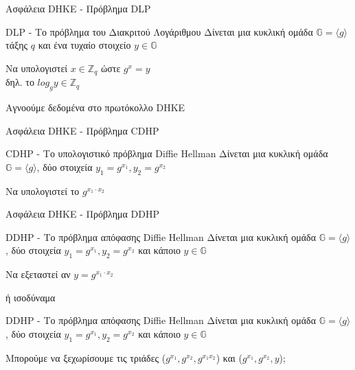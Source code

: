 \documentclass[handout]{beamer}
\begin{document}
\begin{frame}{Ασφάλεια DHKE - Πρόβλημα DLP}

\begin{block}{DLP - Το πρόβλημα του Διακριτού Λογάριθμου}
Δίνεται μια κυκλική ομάδα $\mathbb{G}=\langle g \rangle$ τάξης $q$ και ένα τυχαίο στοιχείο $y \in \mathbb{G}$

Να υπολογιστεί $x \in \mathbb{Z}_q$ ώστε $g^x = y$ \\
δηλ. το $log_g y \in \mathbb{Z}_q$
\end{block}
\pause
\alert{Αγνοούμε δεδομένα στο πρωτόκολλο DHKE}
\end{frame}

\begin{frame}{Ασφάλεια DHKE - Πρόβλημα CDHP}
\begin{block}{CDHP - Το υπολογιστικό πρόβλημα Diffie Hellman}
Δίνεται μια κυκλική ομάδα $\mathbb{G}=\langle g \rangle$, δύο στοιχεία $y_1=g^{x_1}, y_2 = g^{x_2}$

Να υπολογιστεί το $g^{x_1 \cdot x_2}$ 
\end{block}
\end{frame}

\begin{frame}{Ασφάλεια DHKE - Πρόβλημα DDHP}

\begin{block}{DDHP - Το πρόβλημα απόφασης Diffie Hellman}
Δίνεται μια κυκλική  ομάδα $\mathbb{G}=\langle g \rangle$, δύο στοιχεία $y_1=g^{x_1}, y_2 = g^{x_2}$ και κάποιο  $y \in \mathbb{G}$ 

Να εξεταστεί αν  $y = g^{x_1 \cdot x_2}$ 
\end{block}
\pause
ή ισοδύναμα
\begin{block}{DDHP - Το πρόβλημα απόφασης Diffie Hellman}
Δίνεται μια κυκλική  ομάδα $\mathbb{G}=\langle g \rangle$, δύο στοιχεία $y_1=g^{x_1}, y_2 = g^{x_2}$ και κάποιο  $y \in \mathbb{G}$ 

Μπορούμε να ξεχωρίσουμε τις τριάδες ($g^{x_1}, g^{x_2}, g^{x_1 x_2}$) και  ($g^{x_1}, g^{x_2}, y$);
\end{block}
\end{frame}
\end{document}
